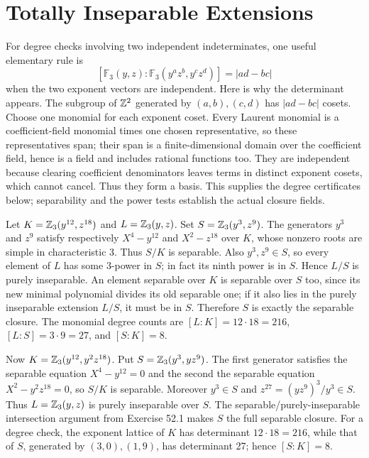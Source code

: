 \section{Totally Inseparable Extensions}
For degree checks involving two independent indeterminates, one useful elementary rule is
\[
[\mathbb F_3(y,z):\mathbb F_3(y^az^b,y^cz^d)]=|ad-bc|
\]
when the two exponent vectors are independent. Here is why the determinant appears. The subgroup of $\mathbb{Z}^2$ generated by $(a,b),(c,d)$ has $|ad-bc|$ cosets. Choose one monomial for each exponent coset. Every Laurent monomial is a coefficient-field monomial times one chosen representative, so these representatives span; their span is a finite-dimensional domain over the coefficient field, hence is a field and includes rational functions too. They are independent because clearing coefficient denominators leaves terms in distinct exponent cosets, which cannot cancel. Thus they form a basis. This supplies the degree certificates below; separability and the power tests establish the actual closure fields.

Let $K=\mathbb{Z}_3(y^{12},z^{18})$ and $L=\mathbb{Z}_3(y,z)$. Set $S=\mathbb{Z}_3(y^3,z^9)$. The generators $y^3$ and $z^9$ satisfy respectively $X^4-y^{12}$ and $X^2-z^{18}$ over $K$, whose nonzero roots are simple in characteristic 3. Thus $S/K$ is separable. Also $y^3,z^9\in S$, so every element of $L$ has some $3$-power in $S$; in fact its ninth power is in $S$. Hence $L/S$ is purely inseparable. An element separable over $K$ is separable over $S$ too, since its new minimal polynomial divides its old separable one; if it also lies in the purely inseparable extension $L/S$, it must be in $S$. Therefore $S$ is exactly the separable closure. The monomial degree counts are $[L:K]=12\cdot18=216$, $[L:S]=3\cdot9=27$, and $[S:K]=8$.

Now $K=\mathbb{Z}_3(y^{12},y^2z^{18})$. Put $S=\mathbb{Z}_3(y^3,yz^9)$. The first generator satisfies the separable equation $X^4-y^{12}=0$ and the second the separable equation $X^2-y^2z^{18}=0$, so $S/K$ is separable. Moreover $y^3\in S$ and $z^{27}=(yz^9)^3/y^3\in S$. Thus $L=\mathbb{Z}_3(y,z)$ is purely inseparable over $S$. The separable/purely-inseparable intersection argument from Exercise 52.1 makes $S$ the full separable closure. For a degree check, the exponent lattice of $K$ has determinant $12\cdot18=216$, while that of $S$, generated by $(3,0),(1,9)$, has determinant 27; hence $[S:K]=8$.

